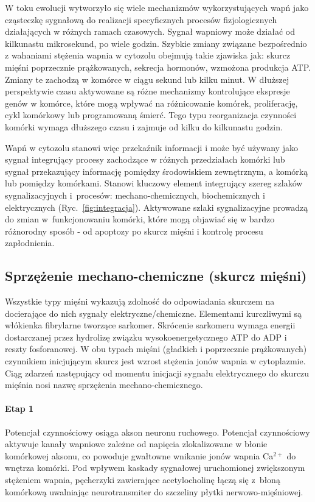 W toku ewolucji wytworzyło się wiele mechanizmów wykorzystujących wapń jako cząsteczkę sygnałową do realizacji specyficznych procesów fizjologicznych działających w różnych ramach czasowych. Sygnał wapniowy może działać od kilkunastu mikrosekund, po wiele godzin. Szybkie zmiany związane bezpośrednio z wahaniami stężenia wapnia w cytozolu obejmują takie zjawiska jak: skurcz mięśni poprzecznie prążkowanych, sekrecja hormonów, wzmożona produkcja ATP. Zmiany te zachodzą w komórce w ciągu sekund lub kilku minut. W dłuższej perspektywie czasu aktywowane są różne mechanizmy kontrolujące ekspresje genów w komórce, które mogą wpływać na różnicowanie komórek, proliferację, cykl komórkowy lub programowaną śmierć. Tego typu reorganizacja czynności komórki wymaga dłuższego czasu i zajmuje od kilku do kilkunastu godzin.

Wapń w cytozolu stanowi więc przekaźnik informacji i może być używany jako sygnał integrujący procesy zachodzące w różnych przedziałach komórki lub sygnał przekazujący informację pomiędzy środowiskiem zewnętrznym, a komórką lub pomiędzy komórkami. Stanowi kluczowy element integrujący szereg szlaków sygnalizacyjnych i~procesów: mechano-chemicznych, biochemicznych i elektrycznych (Ryc.~\ref{fig:integracja}). Aktywowane szlaki sygnalizacyjne prowadzą do zmian w~funkcjonowaniu komórki, które mogą objawiać się w bardzo różnorodny sposób - od apoptozy po skurcz mięśni i kontrolę procesu zapłodnienia.

\subsection{Sprzężenie mechano-chemiczne (skurcz mięśni)}

Wszystkie typy mięśni wykazują zdolność do odpowiadania skurczem na docierające do nich sygnały elektryczne/chemiczne. Elementami kurczliwymi są włókienka fibrylarne tworzące sarkomer. Skrócenie sarkomeru wymaga energii dostarczanej przez hydrolizę związku wysokoenergetycznego ATP do ADP i reszty fosforanowej. W obu typach mięśni (gładkich i poprzecznie prążkowanych) czynnikiem inicjującym skurcz jest wzrost stężenia jonów wapnia w cytoplazmie. Ciąg zdarzeń następujący od momentu inicjacji sygnału elektrycznego do skurczu mięśnia nosi nazwę sprzężenia mechano-chemicznego.


\paragraph{Etap 1}
Potencjał czynnościowy osiąga akson neuronu ruchowego. Potencjał czynnościowy aktywuje kanały wapniowe zależne od napięcia zlokalizowane w błonie komórkowej aksonu, co powoduje gwałtowne wnikanie jonów wapnia Ca$^{2+}$ do wnętrza komórki. Pod wpływem kaskady sygnałowej uruchomionej zwiększonym stężeniem wapnia, pęcherzyki zawierające acetylocholinę łączą się z~błoną komórkową uwalniając neurotransmiter do szczeliny płytki nerwowo-mięśniowej.



